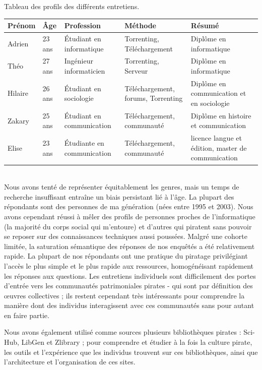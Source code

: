 Tableau des profils des différents entretiens.\\
\begin{tabular}{|p{2cm}|p{2cm}|p{2cm}|p{2cm}|p{2cm}|}

\hline
   Prénom  & Âge & Profession & Méthode & Résumé\\
\hline
    Adrien & 23 ans & Étudiant en informatique & Torrenting, Téléchargement & Diplôme en informatique \\
\hline
    Théo & 27 ans & Ingénieur informaticien & Torrenting, Serveur & Diplôme en informatique\\
\hline
    Hilaire & 26 ans & Étudiant en sociologie & Téléchargement, forums, Torrenting & Diplôme en communication et en sociologie \\
\hline 
    Zakary & 25 ans & Étudiant en communication & Téléchargement, communauté & Diplôme en histoire et communication \\
\hline
    Elise & 23 ans & Étudiante en communication & Téléchargement, communauté & licence langue et édition, master de communication \\
\hline
\end{tabular}\\

Nous avons tenté de représenter équitablement les genres, mais un temps de recherche insuffisant entraîne un biais persistant lié à l'âge. La plupart des répondants sont des personnes de ma génération (nées entre 1995 et 2003). Nous avons cependant réussi à mêler des profils de personnes proches de l'informatique (la majorité du corps social qui m'entoure) et d'autres qui piratent sans pouvoir se reposer sur des connaissances techniques aussi poussées. 
Malgré une cohorte limitée, la saturation sémantique des réponses de nos enquêtés a été relativement rapide. La plupart de nos répondants ont une pratique du piratage privilégiant l'accès le plus simple et le plus rapide aux ressources, homogénéisant rapidement les réponses aux questions. Les entretiens individuels sont difficilement des portes d'entrée vers les communautés patrimoniales pirates - qui sont par définition des œuvres collectives ; ils restent cependant très intéressants pour comprendre la manière dont des individus interagissent avec ces communautés sans pour autant en faire partie.

Nous avons également utilisé comme sources plusieurs bibliothèques pirates : Sci-Hub, LibGen et Zlibrary ; pour comprendre et étudier à la fois la culture pirate, les outils et l'expérience que les individus trouvent sur ces bibliothèques, ainsi que l'architecture et l'organisation de ces sites. 

